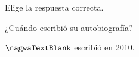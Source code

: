 
\begin{question}

\begin{instance}
  
\begin{mcq}[standalone=false]
    
\begin{stem}
      Elige la respuesta correcta.\par      
\begin{enumerationnolabel}
        \item{          ¿Cuándo escribió su autobiografía?        }        \item{          $\nagwaTextBlank$ escribió en 2010.        }      
\end{enumerationnolabel}
    
\end{stem}
    
\begin{distractors}
\end{distractors}
              
\end{mcq}

\end{instance}

\end{question}

